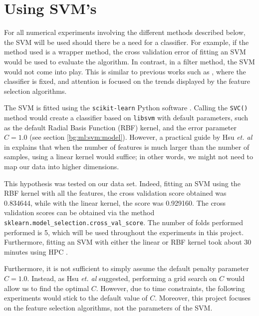 \documentclass[12pt, twoside, a4paper]{report}
\begin{document}
\section{Using SVM's} \label{data:svms}


For all numerical experiments involving the different methods described below, the SVM will be used should there be a need for a classifier. For example, if the method used is a wrapper method, the cross validation error of fitting an SVM would be used to evaluate the algorithm. In contrast, in a filter method, the SVM would not come into play. This is similar to previous works such as \cite{RefWorks:216}, where the classifier is fixed, and attention is focused on the trends displayed by the feature selection algorithms.

The SVM is fitted using the \texttt{scikit-learn} Python software \cite{scikit-learn}. Calling the \texttt{SVC()} method would create a classifier based on \texttt{libsvm} \cite{libsvm} with default parameters, such as the default Radial Basis Function (RBF) kernel, and the error parameter $C=1.0$ (see section \ref{bg:ml:svm:model}). However, a practical guide by Hsu \textit{et. al} in \cite{RefWorks:128} explains that when the number of features is much larger than the number of samples, using a linear kernel would suffice; in other words, we might not need to map our data into higher dimensions.

This hypothesis was tested on our data set. Indeed, fitting an SVM using the RBF kernel with all the features, the cross validation score obtained was 0.834644, while with the linear kernel, the score was 0.929160. The cross validation scores can be obtained via the method \texttt{sklearn.model\_selection.cross\_val\_score}. The number of folds performed performed is 5, which will be used throughout the experiments in this project. Furthermore, fitting an SVM with either the linear or RBF kernel took about 30 minutes using HPC \cite{RefWorks:218}.

Furthermore, it is not sufficient to simply assume the default penalty parameter $C=1.0$. Instead, as Hsu \textit{et. al} suggested, performing a grid search on $C$ would allow us to find the optimal $C$. However, due to time constraints, the following experiments would stick to the default value of $C$. Moreover, this project focuses on the feature selection algorithms, not the parameters of the SVM.
\end{document}
